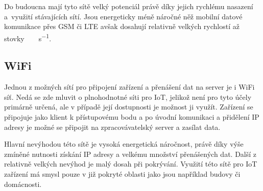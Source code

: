 Do budoucna mají tyto sítě velký potenciál právě díky jejich rychlému nasazení a~využití stávajících sítí. Jsou energeticky méně náročné něž mobilní datové komunikace přes GSM či LTE avšak dosahují relativně velkých rychlostí až stovky~\SI{}{\kilo\bit\per\second}.

\subsection{WiFi}

Jednou z možných sítí pro připojení zařízení a přenášení dat na server je i WiFi síť. Nedá se zde mluvit o plnohodnotné síti pro IoT, jelikož není pro tyto účely primárně určená, ale v případě její dostupnosti je možnost ji využít. Zařízení se připojuje jako klient k přístupovému bodu a po úvodní komunikaci a přidělení IP adresy je možné se připojit na zpracovávatelský server a zasílat data.

Hlavní nevýhodou této sítě je vysoká energetická náročnost, právě díky výše zmíněné nutnosti získání IP adresy a velkému množství přenášených dat. Další z relativně velkých nevýhod je malý dosah při pokrývání. Využití této sítě pro IoT zařízení má smysl pouze v již pokryté oblasti jako jsou například budovy či domácnosti.